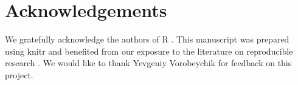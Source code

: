 \documentclass{article}\usepackage[]{graphicx}\usepackage[]{color}
\begin{document}
\section*{Acknowledgements}
We gratefully acknowledge the authors of \textsf{R} \cite{r_core}. This manuscript was prepared using knitr \cite{xie_knitr_2014} and benefited from our exposure to the literature on reproducible research \cite{stodden_reproducible_research_2014}. We would like to thank Yevgeniy Vorobeychik for feedback on this project.




\end{document}
